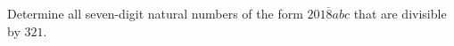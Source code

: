 Determine all seven-digit natural numbers of the form $\overline{2018abc}$ that are divisible by $321$.
